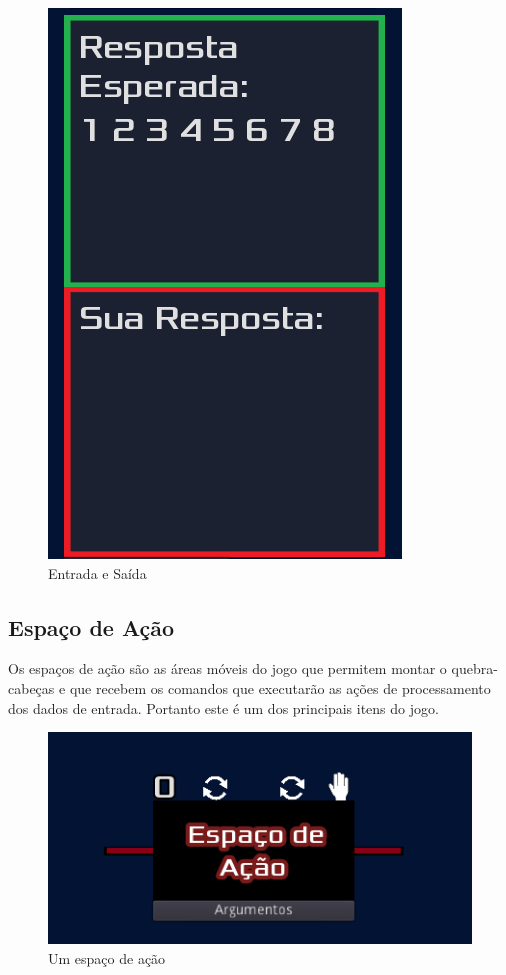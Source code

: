 \begin{figure}[H]
\begin{minipage}{.4\textwidth}
      \includegraphics[scale=0.3]{../figuras/exemplo_saida.png}
    \end{minipage}
    \caption{Entrada e Saída}
\end{figure}

\subsection{Espaço de Ação}

Os espaços de ação são as áreas móveis do jogo que permitem montar o 
quebra-cabeças e que recebem os comandos que executarão as ações de 
processamento dos dados de entrada. Portanto este é um dos principais itens do 
jogo.

\begin{figure}[H]
    \includegraphics[width=\textwidth]{../figuras/espaco_acao.png}
    \caption{Um espaço de ação}
\end{figure}

